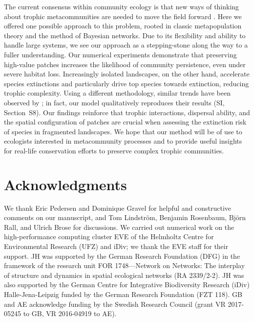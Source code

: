 \documentclass[11pt]{article}
\newcommand{\SI}{SI}
\begin{document}
The current consensus within community ecology is that new ways of thinking about trophic metacommunities are needed to move the field forward \citep{LeiboldChase2018, Guzman2018, Hirtetal2018}. Here we offered one possible approach to this problem, rooted in classic metapopulation theory and the method of Bayesian networks. Due to its flexibility and ability to handle large systems, we see our approach as a stepping-stone along the way to a fuller understanding. Our numerical experiments demonstrate that preserving high-value patches increases the likelihood of community persistence, even under severe habitat loss. Increasingly isolated landscapes, on the other hand, accelerate species extinctions and particularly drive top species towards extinction, reducing trophic complexity.  Using a different methodology, similar trends have been observed by \citet{Ryser2019}; in fact, our model qualitatively reproduces their results (\SI, Section~S8). Our findings reinforce that trophic interactions, dispersal ability, and the spatial configuration of patches are crucial when assessing the extinction risk of species in fragmented landscapes. We hope that our method will be of use to ecologists interested in metacommunity processes and to provide useful insights for real-life conservation efforts to preserve complex trophic communities.


\section*{Acknowledgments} \label{sec:thanks}

We thank Eric Pedersen and Dominique Gravel for helpful and constructive comments on our manuscript, and Tom Lindstr\"om, Benjamin Rosenbaum, Bj\"orn Rall, and Ulrich Brose for discussions. We carried out numerical work on the high-performance computing cluster EVE of the Helmholtz Centre for Environmental Research (UFZ) and iDiv; we thank the EVE staff for their support. JH was supported by the German Research Foundation (DFG) in the framework of the research unit FOR 1748---Network on Networks: The interplay of structure and dynamics in spatial ecological networks (RA 2339/2-2). JH was also supported by the German Centre for Integrative Biodiversity Research (iDiv) Halle-Jena-Leipzig funded by the German Research Foundation (FZT 118). GB and AE acknowledge funding by the Swedish Research Council (grant VR 2017-05245 to GB, VR 2016-04919 to AE).
\end{document}
